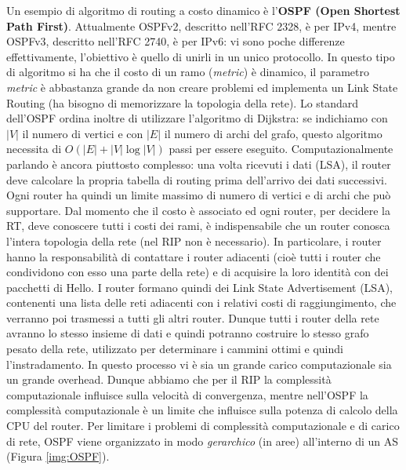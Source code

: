 Un esempio di algoritmo di routing a costo dinamico è l'\textbf{OSPF (Open Shortest Path First)}. Attualmente OSPFv2, descritto nell'RFC 2328, è per IPv4, mentre OSPFv3, descritto nell'RFC 2740, è per IPv6: vi sono poche differenze effettivamente, l'obiettivo è quello di unirli in un unico protocollo. In questo tipo di algoritmo si ha che il costo di un ramo (\textit{metric}) è dinamico, il parametro \textit{metric} è abbastanza grande da non creare problemi ed implementa un Link State Routing (ha bisogno di memorizzare la topologia della rete). Lo standard dell'OSPF ordina inoltre di utilizzare l'algoritmo di Dijkstra: se indichiamo con $|V|$ il numero di vertici e con $|E|$ il numero di archi del grafo, questo algoritmo necessita di $O(|E|+|V|\log |V|)$ passi per essere eseguito. Computazionalmente parlando è ancora piuttosto complesso: una volta ricevuti i dati (LSA), il router deve calcolare la propria tabella di routing prima dell'arrivo dei dati successivi. Ogni router ha quindi un limite massimo di numero di vertici e di archi che può supportare. Dal momento che il costo è associato ed ogni router, per decidere la RT, deve conoscere tutti i costi dei rami, è indispensabile che un router conosca l'intera topologia della rete (nel RIP non è necessario). In particolare, i router hanno la responsabilità di contattare i router adiacenti (cioè tutti i router che condividono con esso una parte della rete) e di acquisire la loro identità con dei pacchetti di Hello. I router formano quindi dei Link State Advertisement (LSA), contenenti una lista delle reti adiacenti con i relativi costi di raggiungimento, che verranno poi trasmessi a tutti gli altri router. Dunque tutti i router della rete avranno lo stesso insieme di dati e quindi potranno costruire lo stesso grafo pesato della rete, utilizzato per determinare i cammini ottimi e quindi l'instradamento. In questo processo vi è sia un grande carico computazionale sia un grande overhead. Dunque abbiamo che per il RIP la complessità computazionale influisce sulla velocità di convergenza, mentre nell'OSPF la complessità computazionale è un limite che influisce sulla potenza di calcolo della CPU del router. Per limitare i problemi di complessità computazionale e di carico di rete, OSPF viene organizzato in modo \textit{gerarchico} (in aree) all'interno di un AS (Figura \ref{img:OSPF}).
